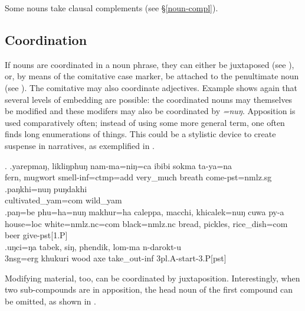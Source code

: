 Some nouns take clausal complements (see §\ref{noun-compl}).

\subsection{Coordination}\label{str-np-coord}

If nouns are coordinated in a noun phrase, they can either be juxtaposed (see \Next[a]), or, by means of the comitative case marker, be attached to the penultimate noun (see \Next[b]). The comitative may also coordinate adjectives. Example \Next[c] shows again that several levels of embedding are possible: the coordinated nouns may themselves be modified and these modifers may also be coordinated by \emph{=nuŋ}. Apposition is used comparatively often; instead of using some more general term, one often finds long enumerations of things. This could be a stylistic device to create suspense in narratives, as exemplified in \Next[d].

\ex. \ag.yarepmaŋ, likliŋphuŋ nam-ma=niŋ=ca   ibibi     sokma  ta-ya=na\\
fern, mugwort smell{\sc -inf=ctmp=add} very\_much breath come{\sc [3sg]-pst=nmlz.sg}\\
 
\bg.paŋkhi=nuŋ   puŋdakhi     \\
cultivated\_yam{\sc =com} wild\_yam\\
 
\bg.paŋ=be     phu=ha=nuŋ      makhur=ha         caleppa, macchi,  khicalek=nuŋ      cuwa py-a \\
house{\sc =loc} white{\sc =nmlz.nc=com}  black{\sc =nmlz.nc} bread, pickles, rice\_dish{\sc =com} beer give{\sc -pst[1.P]}\\
 
\bg.uŋci=ŋa   tabek,   siŋ,     phendik, lom-ma         n-darokt-u\\
{\sc 3nsg=erg} khukuri wood axe take\_out{\sc -inf} {\sc 3pl.A-}start{\sc -3.P[pst]}\\
 

Modifying material, too, can be coordinated by juxtaposition. Interestingly, when two sub-compounds are in apposition, the head noun of the first compound can be omitted, as shown in \Next[c].

